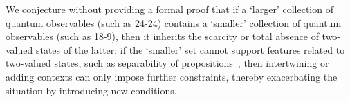\documentclass[
  twocolumn,
 showpacs,
 showkeys,
 preprintnumbers,
 amsmath,amssymb,
 aps,
 prl,
  longbibliography,
 floatfix,
 ]{revtex4-2}
\begin{document}
We conjecture without providing a formal proof that if a `larger' collection of quantum observables (such as 24-24) contains a `smaller' collection of quantum observables (such as 18-9),
then it inherits the scarcity or total absence of two-valued states of the latter: if the `smaller' set cannot support features related to two-valued states, such as separability of propositions~\cite[Theorem 0]{kochen1},
then intertwining or adding contexts can only impose further constraints, thereby exacerbating the situation by introducing new conditions.



\end{document}
